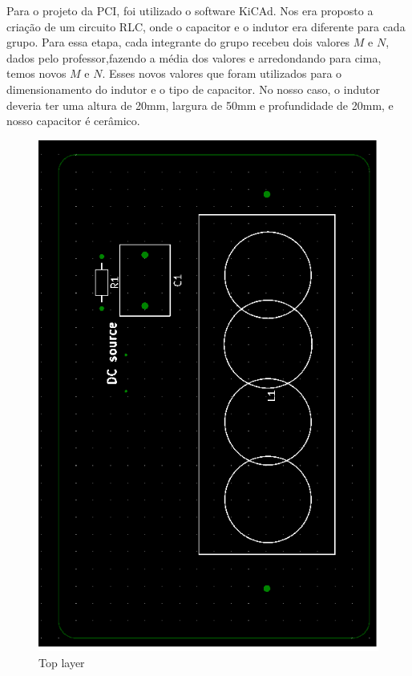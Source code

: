 Para o projeto da PCI, foi utilizado o software KiCAd\cite{kicad}. Nos era proposto a criação de um circuito RLC, onde o capacitor e o indutor era diferente para cada grupo. Para essa etapa, cada integrante do grupo recebeu dois valores $M$ e $N$, dados pelo professor,fazendo a média dos valores e arredondando para cima, temos novos $M$ e $N$. Esses novos valores que foram utilizados para o dimensionamento do indutor e o tipo de capacitor. No nosso caso, o indutor deveria ter uma altura de 20mm, largura de 50mm e profundidade de 20mm, e nosso capacitor é cerâmico.

\begin{figure}[!htb]
    \begin{minipage}{0.5\textwidth}
    \centering
    \includegraphics[scale = 0.5]{PCB_1.png}
    \caption{Top layer}

\end{minipage}
\end{figure}
